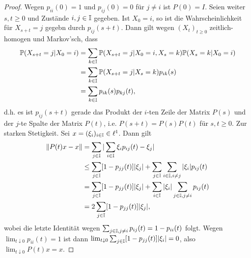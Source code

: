 \documentclass[a4paper]{paper}
\numberwithin{equation}{satz}
\begin{document}
\begin{proof}
  Wegen $p_{ii}(0)=1$ und $p_{ij}(0)=0$ für $j\neq i$ ist $P(0)=I$.  Seien weiter $s,t\geq0$ und Zustände $i,j\in\mathbb{I}$ gegeben. Ist $X_0=i$, so ist die Wahrscheinlichkeit für $X_{s+t}=j$ gegebn durch $p_{ij}(s+t)$. Dann gilt wegen $(X_t)_{t\geq0}$ zeitlich-homogen und Markov'sch, dass
  \begin{align}
  \mathbb{P}(X_{s+t}=j|X_0=i)
  &=\sum_{k\in\mathbb{I}}\mathbb{P}(X_{s+t}=j|X_0=i, X_s=k)\mathbb{P}(X_s=k|X_0=i)\\
  &=\sum_{k\in\mathbb{I}}\mathbb{P}(X_{s+t}=j|X_s=k)p_{ik}(s)\\
  &=\sum_{k\in\mathbb{I}}p_{ik}(s)p_{kj}(t),
  \end{align}
  d.h. es ist $p_{ij}(s+t)$ gerade das Produkt der $i$-ten Zeile der Matrix $P(s)$ und der $j$-te Spalte der Matrix $P(t)$, i.e. $P(s+t)=P(s)P(t)$ für $s,t\geq0$. Zur starken Stetigkeit. Sei $x=(\xi_i)_{i\in\mathbb{I}}\in\ell^1$. Dann gilt
  \begin{align}
    \|P(t)x-x\|
    &=\sum_{j\in\mathbb{I}}|\sum_{i\in\mathbb{I}}\xi_i p_{ij}(t)-\xi_j|\\
    &\leq \sum_{j\in\mathbb{I}}[1-p_{jj}(t)]|\xi_j|+\sum_{j\in\mathbb{I}}\sum_{i\in\mathbb{I},i\neq j}|\xi_i|p_{ij}(t)\\
    &=\sum_{j\in\mathbb{I}}[1-p_{jj}(t)]|\xi_j|+\sum_{i\in\mathbb{I}}|\xi_i|\sum_{j\in\mathbb{I},j\neq i}p_{ij}(t)\\
    &=2\sum_{j\in\mathbb{I}}[1-p_{jj}(t)]|\xi_j|,
  \end{align}
  wobei die letzte Identität wegen $\sum_{j\in\mathbb{I},j\neq i}p_{ij}(t)=1-p_{ii}(t)$ folgt. Wegen $\lim_{t\downarrow 0}p_{ii}(t)=1$ ist dann $\lim_{t\downarrow 0}\sum_{j\in\mathbb{I}}[1-p_{jj}(t)]|\xi_i|=0$, also $\lim_{t\downarrow 0}P(t)x=x$.
\end{proof}
\begin{comment}
\begin{folg}
  Sei $(P(t))_{t\geq0}$ stark stetige Operatorhalbgruppe einer zeitlich-homogene Markovkette $(X_t)_{t\geq0}$ mit Zustandsraum $\I\subseteq \N$. Dann ist die Abbildung$$[0,\infty)\ni t\mapsto p_{i,j}(t)=\P_j(X_t=i)=\P(X_t=i|X_0=j)$$ für alle $i,j\in\mathbb I$ stetig.
\end{folg}

\begin{proof}
Wegen der starken Stetigkeit ist $\lim_{t\to t_0}P(t)e_i=P(t_0)e_i=(p_{i,j}(t_0);j\in\I)$ und damit folgt die punktweise Konvergenz.
\end{proof}
\end{comment}
\end{document}
